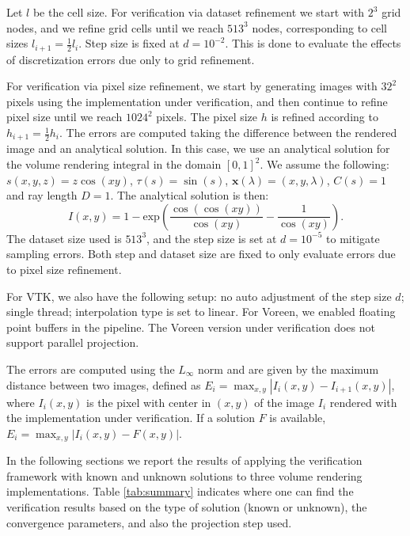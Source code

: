 Let $l$ be the cell size.
For verification via dataset refinement we start with $2^3$ grid
nodes, and we refine grid cells until we reach $513^3$ nodes,
corresponding to cell sizes $l_{i+1} = \frac{1}{2} l_i$. Step size is
fixed at $d = 10^{-2}$. This is done to evaluate the effects
of discretization errors due only to grid refinement.

For verification via pixel size refinement, we start by generating
images with $32^2$ pixels using the implementation under verification,
and then continue to refine pixel size until we reach $1024^2$
pixels. The pixel size $h$ is refined according to $h_{i+1} =
\frac{1}{2} h_i$. The errors are computed taking the difference
between the rendered image and an analytical solution. In this case,
we use an analytical solution for the volume rendering integral in the
domain $[0,1]^2$. We assume the following: $s(x,y,z) = z \cos(xy)$,
$\tau(s) = \sin(s)$, $\textbf{x}(\lambda) = (x, y, \lambda)$, $C(s)
= 1$ and ray length $D = 1$. The analytical solution is then:
\begin{equation}
I(x,y) = 1-\mathrm{exp}{\left(\frac{\cos(\cos(xy))}{\cos(xy)}-\frac{1}{\cos(xy)}\right)}.
\end{equation}
The dataset size used is $513^3$, and the step size is set at $d =
10^{-5}$ to mitigate sampling errors. Both step and dataset size are
fixed to only evaluate errors due to pixel size refinement.

For VTK, we also have the following setup: no auto adjustment of the step
size $d$; single thread; interpolation type is set to linear. 
For Voreen, we enabled floating
point buffers in the pipeline. The Voreen version under verification
does not support parallel projection.

The errors are computed using the $L_\infty$ norm and are given by the
maximum distance between two images, defined as $E_i = \max_{x,y} |
I_{i}(x,y) - I_{i+1}(x,y)|$, where $I_{i}(x,y)$ is the pixel with
center in $(x,y)$ of the image $I_i$ rendered with the implementation
under verification. If a solution $F$ is available, $E_i = \max_{x,y}
| I_{i}(x,y) - F(x,y)|$. 

In the following sections we report the results of applying the
verification framework with known and unknown solutions to three
volume rendering implementations. Table \ref{tab:summary} indicates
where one can find the verification results based on the type of
solution (known or unknown), the convergence parameters, and also the
projection step used.

